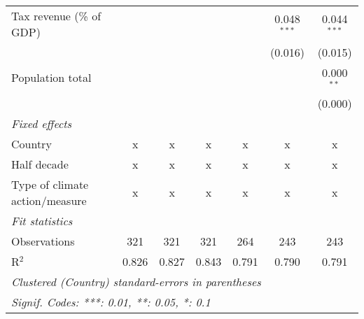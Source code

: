 \begin{tabular}{lcccccc}
   Tax revenue (\% of GDP)                        &         &         &                &                & 0.048$^{***}$  & 0.044$^{***}$\\   
                                                  &         &         &                &                & (0.016)        & (0.015)\\   
   Population total                               &         &         &                &                &                & 0.000$^{**}$\\   
                                                  &         &         &                &                &                & (0.000)\\   
   \emph{Fixed effects}\\
   Country                                        & x       & x       & x              & x              & x              & x\\  
   Half decade                                    & x       & x       & x              & x              & x              & x\\  
   Type of climate action/measure                 & x       & x       & x              & x              & x              & x\\  
   \midrule \emph{Fit statistics}\\
   Observations                                   & 321     & 321     & 321            & 264            & 243            & 243\\  
   R$^2$                                          & 0.826   & 0.827   & 0.843          & 0.791          & 0.790          & 0.791\\  
   \midrule
   \multicolumn{7}{l}{\emph{Clustered (Country) standard-errors in parentheses}}\\
   \multicolumn{7}{l}{\emph{Signif. Codes: ***: 0.01, **: 0.05, *: 0.1}}\\
\end{tabular}
\par\endgroup


